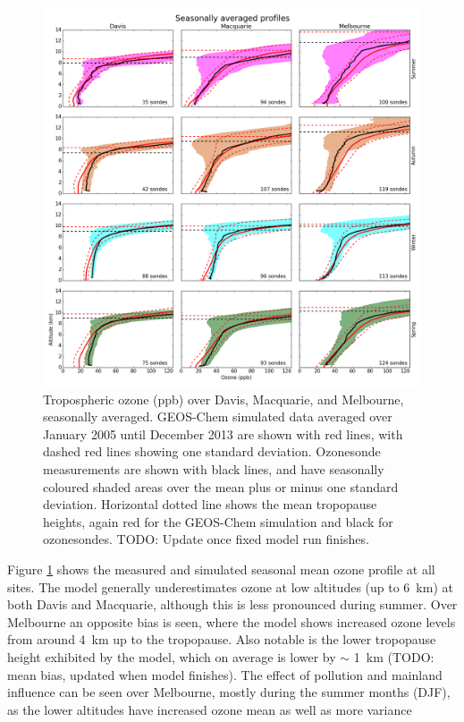 \documentclass{article}
\begin{document}
  \begin{figure}[!htbp]
    \includegraphics[width=\textwidth]{figures/seasonalprofiles00.png}
    \caption{Tropospheric ozone (ppb) over Davis, Macquarie, and Melbourne, seasonally averaged.
    GEOS-Chem simulated data averaged over January 2005 until December 2013 are shown with red lines, with dashed red lines showing one standard deviation.
    Ozonesonde measurements are shown with black lines, and have seasonally coloured shaded areas over the mean plus or minus one standard deviation.
    Horizontal dotted line shows the mean tropopause heights, again red for the GEOS-Chem simulation and black for ozonesondes.
    TODO: Update once fixed model run finishes.}
    \label{fig:GEOSChemSeasonalProfiles}
  \end{figure}
  
  Figure \ref{fig:GEOSChemSeasonalProfiles} shows the measured and simulated seasonal mean ozone profile at all sites.
  The model generally underestimates ozone at low altitudes (up to 6~km) at both Davis and Macquarie, although this is less pronounced during summer.
  Over Melbourne an opposite bias is seen, where the model shows increased ozone levels from around 4~km up to the tropopause.
  Also notable is the lower tropopause height exhibited by the model, which on average is lower by $\sim$ 1~km (TODO: mean bias, updated when model finishes).
  The effect of pollution and mainland influence can be seen over Melbourne, mostly during the summer months (DJF), as the lower altitudes have increased ozone mean as well as more variance
  
\end{document}
